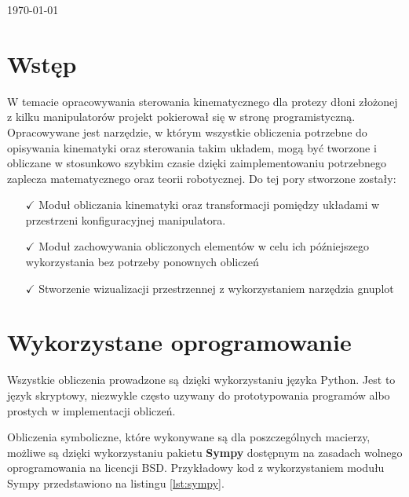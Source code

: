 \documentclass[polish,polish]{article}
\begin{document}
\begin{titlepage}

{\large \today}\\[2cm] %
 

\vfill %

\end{titlepage}

\section{Wstęp}
W temacie opracowywania sterowania kinematycznego dla protezy dłoni złożonej z kilku manipulatorów projekt pokierował się w stronę programistyczną. 
Opracowywane jest narzędzie, w którym wszystkie obliczenia potrzebne do opisywania kinematyki oraz sterowania takim układem, mogą być tworzone i obliczane w stosunkowo szybkim czasie dzięki zaimplementowaniu potrzebnego zaplecza matematycznego oraz teorii robotycznej. 
Do tej pory stworzone zostały:
\begin{itemize}
\item[$\checkmark$] Moduł obliczania kinematyki oraz transformacji pomiędzy układami w przestrzeni konfiguracyjnej manipulatora.
\item[$\checkmark$] Moduł zachowywania obliczonych elementów w celu ich późniejszego wykorzystania bez potrzeby ponownych obliczeń
\item[$\checkmark$] Stworzenie wizualizacji przestrzennej z wykorzystaniem narzędzia gnuplot
\end{itemize}


\newpage
\section{Wykorzystane oprogramowanie}

Wszystkie obliczenia prowadzone są dzięki wykorzystaniu języka Python. 
Jest to język skryptowy, niezwykle często uzywany do prototypowania programów albo prostych w implementacji obliczeń.

Obliczenia symboliczne, które wykonywane są dla poszczególnych macierzy, możliwe są dzięki wykorzystaniu pakietu \textbf{Sympy} dostępnym na zasadach wolnego oprogramowania na licencji BSD. Przykładowy kod z wykorzystaniem modułu Sympy przedstawiono na listingu \ref{lst:sympy}.
\end{document}
